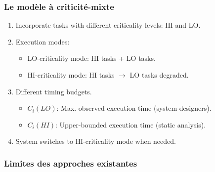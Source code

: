 \documentclass{beamer}
\begin{document}
\begin{frame}
	\frametitle{Le modèle à criticité-mixte}
	\begin{enumerate}
		
		\item Incorporate tasks with different criticality levels: HI and LO.
		\item Execution modes:
		\begin{itemize}
			\item LO-criticality mode: HI tasks + LO tasks.
			\item HI-criticality mode: HI tasks $\rightarrow$ 
			LO tasks degraded.
		\end{itemize}
		\item Different timing budgets.
		\begin{itemize}
			\item $C_i(LO)$: Max. observed execution time (system designers).
			\item $C_i(HI)$: Upper-bounded execution time (static analysis).
		\end{itemize}
		\item System switches to HI-criticality mode when needed.
	\end{enumerate}
	
\end{frame}

\begin{frame}
	\frametitle{Limites des approches existantes}
\end{frame}
\end{document}
